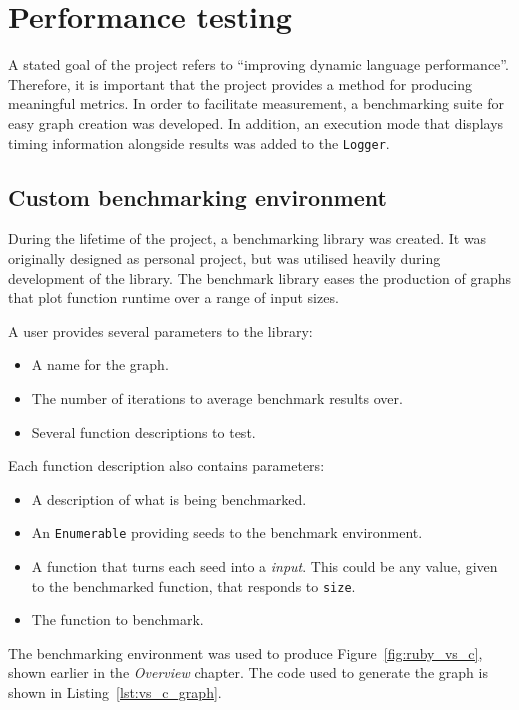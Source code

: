 \section{Performance testing}
A stated goal of the project refers to ``improving dynamic language performance''.
Therefore, it is important that the project provides a method for producing meaningful metrics.
In order to facilitate measurement, a benchmarking suite for easy graph creation was developed.
In addition, an execution mode that displays timing information alongside results was added to the \verb|Logger|.

\subsection{Custom benchmarking environment}
During the lifetime of the project, a benchmarking library was created. It was originally designed as personal project, but was utilised heavily during development of the library.  The benchmark library eases the production of graphs that plot function runtime over a range of input sizes.

A user provides several parameters to the library:
\begin{itemize}
\item A name for the graph.
\item The number of iterations to average benchmark results over.
\item Several function descriptions to test.
\end{itemize}

Each function description also contains parameters:
\begin{itemize}
\item A description of what is being benchmarked.
\item An \verb|Enumerable| providing seeds to the benchmark environment.
\item A function that turns each seed into a \emph{input}. This could be any value, given to the benchmarked function, that responds to \verb|size|.
\item The function to benchmark.
\end{itemize}

The benchmarking environment was used to produce Figure~\ref{fig:ruby_vs_c}, shown earlier in the \emph{Overview} chapter. The code used to generate the graph is shown in Listing~\ref{lst:vs_c_graph}.


